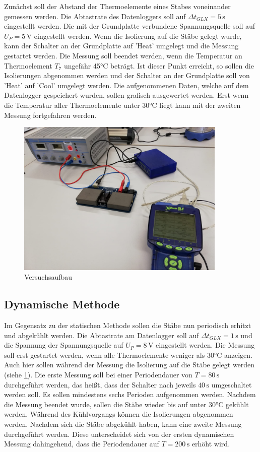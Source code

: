 Zunächst soll der Abstand der Thermoelemente eines Stabes voneinander gemessen werden.
Die Abtastrate des Datenloggers soll auf $\Delta t_{GLX} = 5\, \si{\second}$ eingestellt werden.
Die mit der Grundplatte verbundene Spannungsquelle soll auf $U_P = 5\, \si{\volt}$ eingestellt 
werden. Wenn die Isolierung auf die Stäbe gelegt wurde, kann der Schalter an der Grundplatte auf
'Heat' umgelegt und die Messung gestartet werden. Die Messung soll beendet werden, wenn die 
Temperatur an Thermoelement $T_7$ ungefähr 45°C beträgt. Ist dieser Punkt erreicht, so sollen 
die Isolierungen abgenommen werden und der Schalter an der Grundplatte soll von 'Heat' auf
'Cool' umgelegt werden. Die aufgenommenen Daten, welche auf dem Datenlogger gespeichert wurden,
sollen grafisch ausgewertet werden. Erst wenn die Temperatur aller Thermoelemente unter 30°C 
liegt kann mit der zweiten Messung fortgefahren werden.


\begin{figure}[H]
    \centering
    \includegraphics[width=10cm]{content/204.jpg}
  
    \caption{Versuchsaufbau}
      \label{fig:durchfuehrungbild2}
\end{figure}


\subsection{Dynamische Methode}

Im Gegensatz zu der statischen Methode sollen die Stäbe nun periodisch erhitzt und 
abgekühlt werden. Die Abtastrate am Datenlogger soll auf $\Delta t_{GLX} = 1\, \si{\second}$
und die Spannung der Spannungsquelle auf $U_P = 8\, \si{\volt}$ eingestellt werden. Die Messung soll
erst gestartet werden, wenn alle Thermoelemente weniger als 30°C anzeigen. Auch hier sollen während 
der Messung die Isolierung auf die Stäbe gelegt werden (siehe \ref{fig:durchfuehrungbild2}). Die erste Messung soll bei einer Periodendauer
von $T = 80\, \si{\second}$ durchgeführt werden, das heißt, dass der Schalter nach jeweils 
$40\, \si{\second}$ umgeschaltet werden soll. Es sollen mindestens sechs Perioden 
aufgenommen werden.
Nachdem die Messung beendet wurde, sollen die Stäbe wieder bis auf unter 30°C gekühlt werden.
Während des Kühlvorgangs können die Isolierungen abgenommen werden. Nachdem sich die Stäbe 
abgekühlt haben, kann eine zweite Messung durchgeführt werden. Diese unterscheidet sich von der
ersten dynamischen Messung dahingehend, dass die Periodendauer auf $T = 200\, \si{\second}$ 
erhöht wird.  

